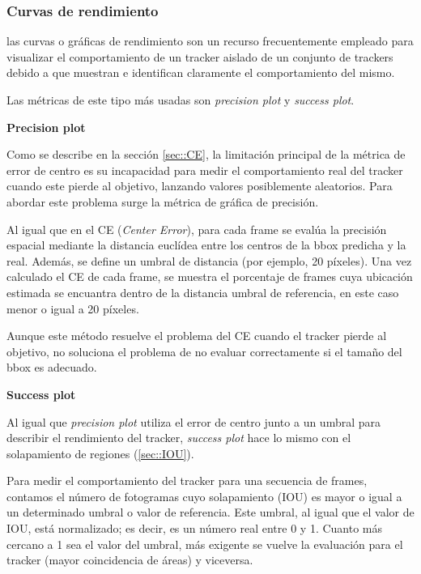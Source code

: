 \subsubsection{Curvas de rendimiento}

las curvas o gráficas de rendimiento son un recurso frecuentemente empleado para visualizar el comportamiento de un tracker aislado de un conjunto de trackers debido a que muestran e identifican claramente el comportamiento del mismo. 

Las métricas de este tipo más usadas son \textit{precision plot} y \textit{success plot}.

\vspace{0,35cm}
\textbf{Precision plot}

Como se describe en la sección \ref{sec::CE}, la limitación principal de la métrica de error de centro es su incapacidad para medir el comportamiento real del tracker cuando este pierde al objetivo, lanzando valores posiblemente aleatorios. Para abordar este problema surge la métrica de gráfica de precisión.

Al igual que en el CE (\textit{Center Error}), para cada frame se evalúa la precisión espacial mediante la distancia euclídea entre los centros de la bbox predicha y la real. Además, se define un umbral de distancia (por ejemplo, 20 píxeles). Una vez calculado el CE de cada frame, se muestra el porcentaje de frames cuya ubicación estimada se encuantra dentro de la distancia umbral de referencia, en este caso menor o igual a 20 píxeles.

Aunque este método resuelve el problema del CE cuando el tracker pierde al objetivo, no soluciona el problema de no evaluar correctamente si el tamaño del bbox es adecuado. 

\textbf{Success plot}

Al igual que \textit{precision plot} utiliza el error de centro junto a un umbral para describir el rendimiento del tracker, \textit{success plot} hace lo mismo con el solapamiento de regiones (\ref{sec::IOU}).

Para medir el comportamiento del tracker para una secuencia de frames, contamos el número de fotogramas cuyo solapamiento (IOU) es mayor o igual a un determinado umbral o valor de referencia. Este umbral, al igual que el valor de IOU, está normalizado; es decir, es un número real entre 0 y 1. Cuanto más cercano a 1 sea el valor del umbral, más exigente se vuelve la evaluación para el tracker (mayor coincidencia de áreas) y viceversa.

